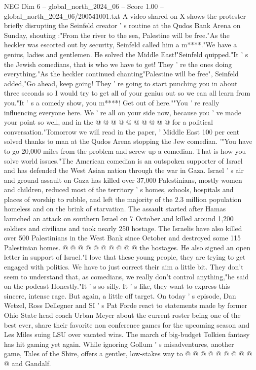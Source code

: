 \begin{textsample}{NEG Dim 6 – global\_north\_2024\_06 – Score 1.00 – global\_north\_2024\_06/200541001.txt}  \label{ex:f6_neg_310}
A video shared on X shows the protester briefly disrupting the Seinfeld creator ' s routine at the Qudos Bank Arena on Sunday, shouting :"From the river to the sea, Palestine will be free."As the heckler was escorted out by security, Seinfeld called him a m****."We have a genius, ladies and gentlemen.
He solved the Middle East!"Seinfeld quipped."It ' s the Jewish comedians, that is who we have to get!
They ' re the ones doing everything."As the heckler continued chanting"Palestine will be free", Seinfeld added,"Go ahead, keep going!
They ' re going to start punching you in about three seconds so I would try to get all of your genius out so we can all learn from you."It ' s a comedy show, you m****!
Get out of here.""You ' re really influencing everyone here.
We ' re all on your side now, because you ' ve made your point so well, and in the @ @ @ @ @ @ @ @ @ @ for a political conversation."Tomorrow we will read in the paper, ' Middle East 100 per cent solved thanks to man at the Qudos Arena stopping the Jew comedian. '"You have to go 20,000 miles from the problem and screw up a comedian.
That is how you solve world issues."The American comedian is an outspoken supporter of Israel and has defended the West Asian nation through the war in Gaza.
Israel ' s air and ground assault on Gaza has killed over 37,000 Palestinians, mostly women and children, reduced most of the territory ' s homes, schools, hospitals and places of worship to rubble, and left the majority of the 2.3 million population homeless and on the brink of starvation.
The assault started after Hamas launched an attack on southern Israel on 7 October and killed around 1,200 soldiers and civilians and took nearly 250 hostage.
The Israelis have also killed over 500 Palestinians in the West Bank since October and destroyed some 115 Palestinian homes. @ @ @ @ @ @ @ @ @ @ the hostages.
He also signed an open letter in support of Israel."I love that these young people, they are trying to get engaged with politics.
We have to just correct their aim a little bit.
They don't seem to understand that, as comedians, we really don't control anything,"he said on the podcast Honestly."It ' s so silly.
It ' s like, they want to express this sincere, intense rage.
But again, a little off target.
On today ' s episode, Dan Wetzel, Ross Dellegner and SI ' s Pat Forde react to statements made by former Ohio State head coach Urban Meyer about the current roster being one of the best ever, share their favorite non conference games for the upcoming season and Les Miles suing LSU over vacated wins.
The march of big-budget Tolkien fantasy has hit gaming yet again.
While ignoring Gollum ' s misadventures, another game, Tales of the Shire, offers a gentler, low-stakes way to @ @ @ @ @ @ @ @ @ @ and Gandalf.

\end{textsample}
